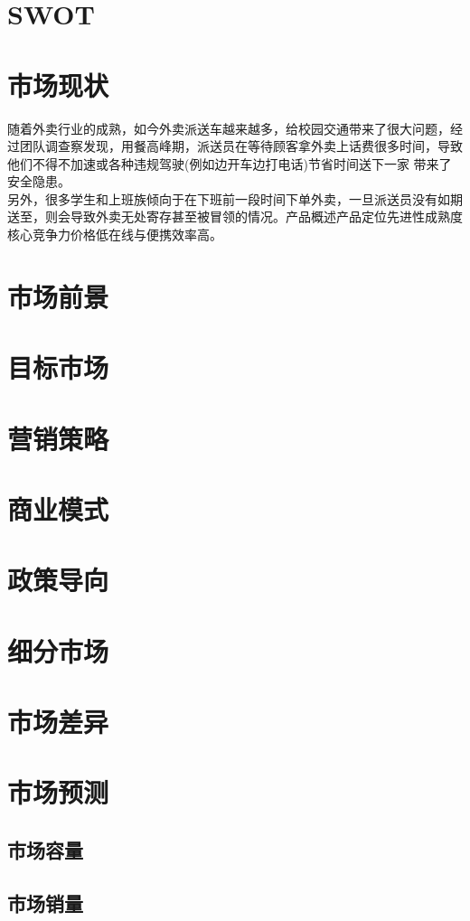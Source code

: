 \documentclass[violet]{main}
\begin{document}
		\section{SWOT}
		\section{市场现状}
			随着外卖行业的成熟，如今外卖派送车越来越多，给校园交通带来了很大问题，经过团队调查察发现，用餐高峰期，派送员在等待顾客拿外卖上话费很多时间，导致他们不得不加速或各种违规驾驶(例如边开车边打电话)节省时间送下一家 带来了安全隐患。
			\\\indent 另外，很多学生和上班族倾向于在下班前一段时间下单外卖，一旦派送员没有如期送至，则会导致外卖无处寄存甚至被冒领的情况。产品概述产品定位先进性成熟度核心竞争力价格低在线与便携效率高。
		\section{市场前景}
		\section{目标市场}
		\section{营销策略}
		\section{商业模式}
		\section{政策导向}
		\section{细分市场}
		\section{市场差异}
		\section{市场预测}
			\subsection{市场容量}
			\subsection{市场销量}
\end{document}
